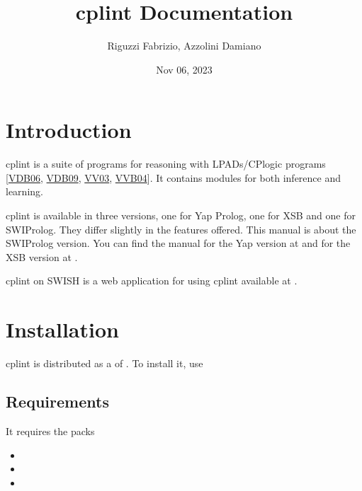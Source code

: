 \documentclass[letterpaper,10pt,english]{sphinxmanual}
\title{cplint Documentation}
\date{Nov 06, 2023}
\author{Riguzzi Fabrizio, Azzolini Damiano}
\begin{document}
\pagestyle{empty}
\sphinxmaketitle
\pagestyle{plain}
\sphinxtableofcontents
\pagestyle{normal}
\label{\detokenize{index::doc}}



\chapter{Introduction}
\label{\detokenize{index:introduction}}
\sphinxAtStartPar
cplint is a suite of programs for reasoning with LPADs/CP\sphinxhyphen{}logic programs {[}\hyperlink{cite.index:id66}{VDB06}, \hyperlink{cite.index:id67}{VDB09}, \hyperlink{cite.index:id65}{VV03}, \hyperlink{cite.index:id45}{VVB04}{]}.
It contains modules for both inference and learning.

\sphinxAtStartPar
cplint is available in three versions, one for Yap Prolog, one for XSB and one for SWI\sphinxhyphen{}Prolog.
They differ slightly in the features offered.
This manual is about the SWI\sphinxhyphen{}Prolog version.
You can find the manual for the Yap version at  and
for the XSB version at .

\sphinxAtStartPar
cplint on SWISH is a web application for using cplint available at .


\chapter{Installation}
\label{\detokenize{index:installation}}
\sphinxAtStartPar
cplint is distributed as a  of .
To install it, use

\begin{sphinxVerbatim}[commandchars=\\\{\}]
 
\end{sphinxVerbatim}


\section{Requirements}
\label{\detokenize{index:requirements}}
\sphinxAtStartPar
It requires the packs
\begin{itemize}
\item {} 
\sphinxAtStartPar
{}

\item {} 
\sphinxAtStartPar
{}

\item {} 
\sphinxAtStartPar
{}

\end{itemize}
\end{document}
